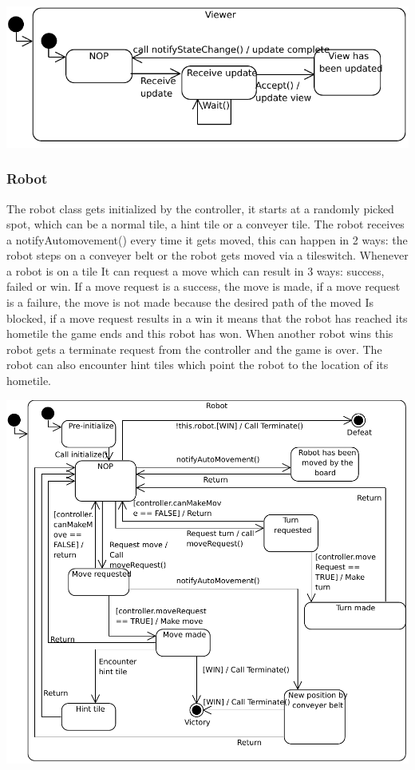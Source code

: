 	\includegraphics[width=\linewidth]{statecharts/view.pdf}

	\subsubsection{Robot}
	The robot class gets initialized by the controller, it starts at a randomly picked spot, which can be a normal tile, a hint tile or a conveyer tile. The robot receives a notifyAutomovement() every time it gets moved, this can happen in 2 ways: the robot steps on a conveyer belt or the robot gets moved via a tileswitch. Whenever a robot is on a tile It can request a move which can result in 3 ways: success, failed or win. If a move request is a success, the move is made, if a move request is a failure, the move is not made because the desired path of the moved Is blocked, if a move request results in a win it means that the robot has reached its hometile the game ends and this robot has won. When another robot wins this robot gets a terminate request from the controller and the game is over. The robot can also encounter hint tiles which point the robot to the location of its hometile.
	
	\includegraphics[width=\linewidth]{statecharts/robot.pdf}
	

	
